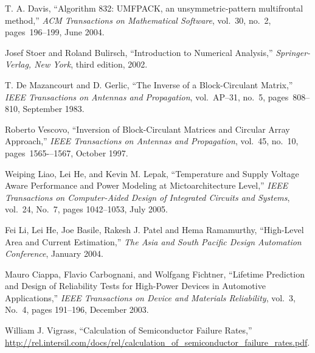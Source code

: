 \begin{thebibliography}{99}
    T. A. Davis,
    ``Algorithm 832: UMFPACK, an unsymmetric-pattern multifrontal method,''
    \emph{ACM Transactions on Mathematical Software},
    vol.~30, no.~2, pages~196--199, June 2004.

    Josef Stoer and Roland Bulirsch,
    ``Introduction to Numerical Analysis,''
    \emph{Springer-Verlag, New York},
    third edition, 2002.

    T. De Mazancourt and D. Gerlic,
    ``The Inverse of a Block-Circulant Matrix,''
    \emph{IEEE Transactions on Antennas and Propagation},
    vol.~AP–31, no.~5, pages~808–810, September 1983.

    Roberto Vescovo,
    ``Inversion of Block-Circulant Matrices and Circular Array Approach,''
    \emph{IEEE Transactions on Antennas and Propagation},
    vol.~45, no.~10, pages~1565-–1567, October 1997.

    Weiping Liao, Lei He, and Kevin M. Lepak,
    ``Temperature and Supply Voltage Aware Performance and Power Modeling at Mictoarchitecture Level,''
    \emph{IEEE Transactions on Computer-Aided Design of Integrated Circuits and Systems},
    vol.~24, No.~7, pages 1042--1053, July 2005.

    Fei Li, Lei He, Joe Basile, Rakesh J. Patel and Hema Ramamurthy,
    ``High-Level Area and Current Estimation,''
    \emph{The Asia and South Pacific Design Automation Conference},
    January 2004.

    Mauro Ciappa, Flavio Carbognani, and Wolfgang Fichtner,
    ``Lifetime Prediction and Design of Reliability Tests for High-Power Devices in Automotive Applications,''
    \emph{IEEE Transactions on Device and Materials Reliability},
    vol.~3, No.~4, pages 191--196, December 2003.

    William J. Vigrass,
    ``Calculation of Semiconductor Failure Rates,''
    \url{http://rel.intersil.com/docs/rel/calculation_of_semiconductor_failure_rates.pdf}.
\end{thebibliography}
